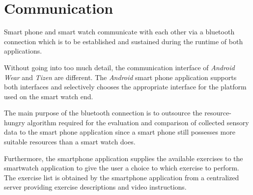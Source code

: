 \section{Communication}

Smart phone and smart watch communicate with each other via a bluetooth
connection which is to be established and sustained during the runtime of both
applications.

Without going into too much detail, the communication interface
of \textit{Android Wear} and \textit{Tizen} are different. The \textit{Android}
smart phone application supports both interfaces and selectively chooses the
appropriate interface for the platform used on the smart watch end.

The main purpose of the bluetooth connection is to outsource the
resource-hungry algorithm required for the evaluation and comparison of
collected sensory data to the smart phone application since a smart phone still
possesses more suitable resources than a smart watch does.

Furthermore, the smartphone application supplies the available exercises to
the smartwatch application to give the user a choice to which exercise to
perform. The exercise list is obtained by the smartphone application from a
centralized server providing exercise descriptions and video instructions.
